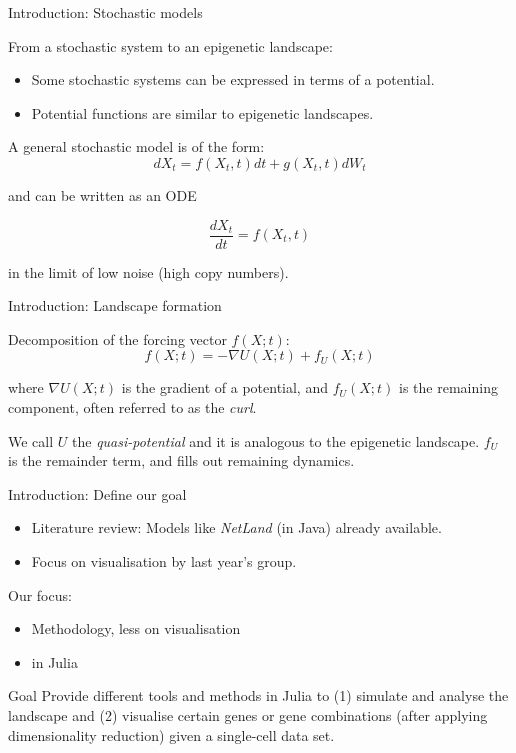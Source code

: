 \documentclass{beamer}
\begin{document}
\begin{frame}{Introduction: Stochastic models}

From a stochastic system to an epigenetic landscape:
\begin{itemize}
\item Some stochastic systems can be expressed in terms of a potential.
\item Potential functions are similar to epigenetic landscapes.
\end{itemize}

\vfill
A general stochastic model is of the form: 
\begin{equation}\label{sde}
dX_{t} = f(X_{t}, t)dt + g(X_{t}, t) dW_{t}
\end{equation} 

and can be written as an ODE

\[  \frac{dX_{t}}{dt} = f(X_{t}, t)
\]

in the limit of low noise (high copy numbers).

\end{frame}

\begin{frame}{Introduction: Landscape formation}

Decomposition of the forcing vector $f(X; t)$:
\begin{equation}\label{decomp}
f(X; t) = -\nabla U(X; t) + f_U(X; t)
\end{equation}

where \( \nabla U(X; t) \) is the gradient of a potential, and \(f_U(X; t)\) is the remaining component, often referred to as the \textit{curl}.

\vfill
We call $U$ the \textit{quasi-potential} and it is analogous to the epigenetic landscape. $f_U$ is the remainder term, and fills out remaining dynamics. %

\end{frame}

\begin{frame}{Introduction: Define our goal}

\begin{itemize}
\item Literature review: Models like \textit{NetLand} (in Java) already available. 
\item Focus on visualisation by last year's group.
\end{itemize}

\vfill
Our focus:
\begin{itemize}
\item Methodology, less on visualisation
\item in Julia
\end{itemize}

\begin{block}{Goal}
Provide different tools and methods in Julia to 
(1) simulate and analyse the landscape and (2) visualise certain genes or gene combinations (after applying dimensionality reduction) given a single-cell data set.
\end{block}

\end{frame}
\end{document}
